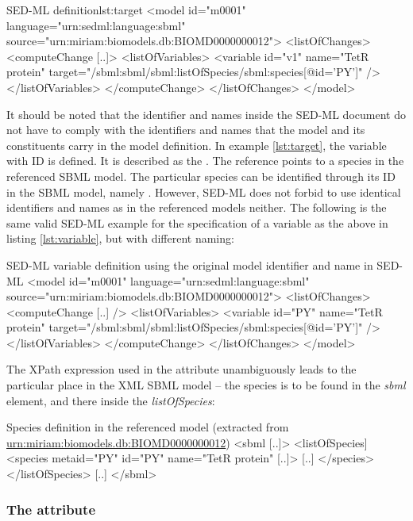 %
\begin{myXmlLst}{SED-ML  definition}{lst:target}
<model id="m0001" language="urn:sedml:language:sbml" 
 source="urn:miriam:biomodels.db:BIOMD0000000012">
 <listOfChanges>
  <computeChange [..]>
   <listOfVariables>
    <variable id="v1" name="TetR protein" target="/sbml:sbml/sbml:listOfSpecies/sbml:species[@id='PY']" />
   </listOfVariables>
  </computeChange>
 </listOfChanges>
</model>
\end{myXmlLst}
%
It should be noted that the identifier and names inside the SED-ML document do not have to comply with the identifiers and names that the model and its constituents carry in the model definition. In  example \ref{lst:target}, the variable with ID  is defined. It is described as the . The reference points to a species in the referenced SBML model. The particular species can be identified through its ID in the SBML model, namely . However, SED-ML does not forbid to use identical identifiers and names as in the referenced models neither. The following is the same valid SED-ML example for the specification of a variable as the above in listing \ref{lst:variable}, but with different naming:
%
\begin{myXmlLst}{SED-ML variable definition using the original model identifier and name in SED-ML}{}
<model id="m0001" language="urn:sedml:language:sbml" 
 source="urn:miriam:biomodels.db:BIOMD0000000012">
 <listOfChanges>
  <computeChange [..] />
   <listOfVariables>
    <variable id="PY" name="TetR protein" target="/sbml:sbml/sbml:listOfSpecies/sbml:species[@id='PY']" />
   </listOfVariables>
  </computeChange>
 </listOfChanges>
</model>
\end{myXmlLst}
%

The XPath expression used in the  attribute unambiguously leads to the particular place in the XML SBML model -- the species is to be found in the \emph{sbml} element, and there inside the \emph{listOfSpecies}:
%
\begin{myXmlLst}{Species definition in the referenced model (extracted from \url{urn:miriam:biomodels.db:BIOMD0000000012})}{}
<sbml [..]>
 <listOfSpecies]
  <species metaid="PY" id="PY" name="TetR protein" [..]>
   [..]
  </species>
 </listOfSpecies>
 [..]
</sbml>
\end{myXmlLst}
%

\subsubsection{The  attribute}
\label{sec:symbol}

